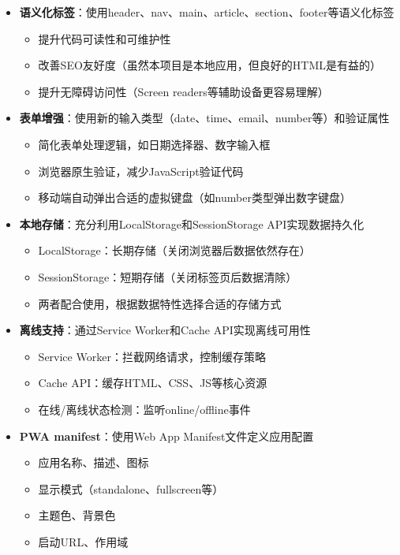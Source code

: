 \documentclass[12pt,a4paper]{article}
\begin{document}
\begin{itemize}
    \item \textbf{语义化标签}：使用header、nav、main、article、section、footer等语义化标签
        \begin{itemize}
            \item 提升代码可读性和可维护性
            \item 改善SEO友好度（虽然本项目是本地应用，但良好的HTML是有益的）
            \item 提升无障碍访问性（Screen readers等辅助设备更容易理解）
        \end{itemize}
    \item \textbf{表单增强}：使用新的输入类型（date、time、email、number等）和验证属性
        \begin{itemize}
            \item 简化表单处理逻辑，如日期选择器、数字输入框
            \item 浏览器原生验证，减少JavaScript验证代码
            \item 移动端自动弹出合适的虚拟键盘（如number类型弹出数字键盘）
        \end{itemize}
    \item \textbf{本地存储}：充分利用LocalStorage和SessionStorage API实现数据持久化
        \begin{itemize}
            \item LocalStorage：长期存储（关闭浏览器后数据依然存在）
            \item SessionStorage：短期存储（关闭标签页后数据清除）
            \item 两者配合使用，根据数据特性选择合适的存储方式
        \end{itemize}
    \item \textbf{离线支持}：通过Service Worker和Cache API实现离线可用性
        \begin{itemize}
            \item Service Worker：拦截网络请求，控制缓存策略
            \item Cache API：缓存HTML、CSS、JS等核心资源
            \item 在线/离线状态检测：监听online/offline事件
        \end{itemize}
    \item \textbf{PWA manifest}：使用Web App Manifest文件定义应用配置
        \begin{itemize}
            \item 应用名称、描述、图标
            \item 显示模式（standalone、fullscreen等）
            \item 主题色、背景色
            \item 启动URL、作用域
        \end{itemize}
\end{itemize}
\end{document}
